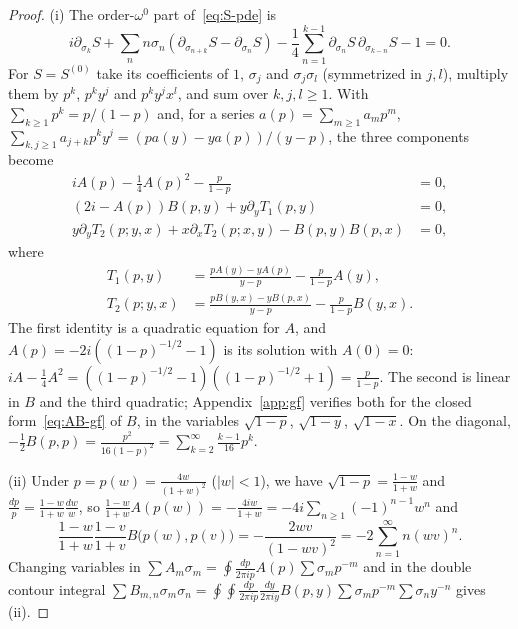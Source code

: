 \documentclass[twoside,10pt]{article}
\numberwithin{equation}{section}
\theoremstyle{slbody}
\theoremstyle{definition}
\theoremstyle{remark}
\begin{document}
\begin{proof}
(i) The order-\(\omega^0\) part of~\eqref{eq:S-pde} is
\[
 i\partial_{\sigma_k}S+\sum_nn\sigma_n(\partial_{\sigma_{n+k}}S-\partial_{\sigma_n}S)
 -\frac14\sum_{n=1}^{k-1}\partial_{\sigma_n}S\,\partial_{\sigma_{k-n}}S-1=0.
\]
For \(S=S^{(0)}\) take its coefficients of \(1\), \(\sigma_j\) and
\(\sigma_j\sigma_l\) (symmetrized in \(j,l\)), multiply them by \(p^k\),
\(p^ky^j\) and \(p^ky^jx^l\), and sum over \(k,j,l\geq1\).  With
\(\sum_{k\geq1}p^k=p/(1-p)\) and, for a series \(a(p)=\sum_{m\geq1}a_mp^m\),
\(\sum_{k,j\geq1}a_{j+k}p^ky^j=(pa(y)-ya(p))/(y-p)\), the three components
become
\begin{align*}
 iA(p)-\tfrac14 A(p)^2-\frac{p}{1-p}&=0,\\
 (2i-A(p))B(p,y)+y\partial_yT_1(p,y)&=0,\\
 y\partial_yT_2(p;y,x)+x\partial_xT_2(p;x,y)-B(p,y)B(p,x)&=0,
\end{align*}
where
\begin{align*}
 T_1(p,y)&=\frac{pA(y)-yA(p)}{y-p}-\frac{p}{1-p}A(y),\\
 T_2(p;y,x)&=\frac{pB(y,x)-yB(p,x)}{y-p}-\frac{p}{1-p}B(y,x).
\end{align*}
The first identity is a quadratic equation for \(A\), and
\(A(p)=-2i((1-p)^{-1/2}-1)\) is its solution with \(A(0)=0\):
\(iA-\frac14A^2=((1-p)^{-1/2}-1)((1-p)^{-1/2}+1)=\frac{p}{1-p}\).  The second
is linear in \(B\) and the third quadratic; Appendix~\ref{app:gf} verifies both
for the closed form~\eqref{eq:AB-gf} of \(B\), in the variables
\(\sqrt{1-p}\), \(\sqrt{1-y}\), \(\sqrt{1-x}\).  On the diagonal,
\(-\frac12 B(p,p)=\frac{p^2}{16(1-p)^2}
=\sum_{k=2}^\infty\frac{k-1}{16}p^k\).

(ii) Under \(p=p(w)=\frac{4w}{(1+w)^2}\) (\(|w|<1\)), we have
\(\sqrt{1-p}=\frac{1-w}{1+w}\) and \(\frac{dp}{p}=\frac{1-w}{1+w}\frac{dw}{w}\),
so \(\frac{1-w}{1+w}A(p(w))=-\frac{4iw}{1+w}=-4i\sum_{n\geq1}(-1)^{n-1}w^n\)
and
\[
 \frac{1-w}{1+w}\frac{1-v}{1+v}B\bigl(p(w),p(v)\bigr)
 =-\frac{2wv}{(1-wv)^2}
 =-2\sum_{n=1}^\infty n(wv)^n.
\]
Changing variables in \(\sum A_m\sigma_m=\oint\frac{dp}{2\pi i p}A(p)\sum\sigma_m p^{-m}\)
and in the double contour integral
\(\sum B_{m,n}\sigma_m\sigma_n=\oint\oint\frac{dp}{2\pi i p}\frac{dy}{2\pi i y}B(p,y)\sum\sigma_m p^{-m}\sum\sigma_n y^{-n}\)
gives (ii).


\end{proof}
\end{document}
